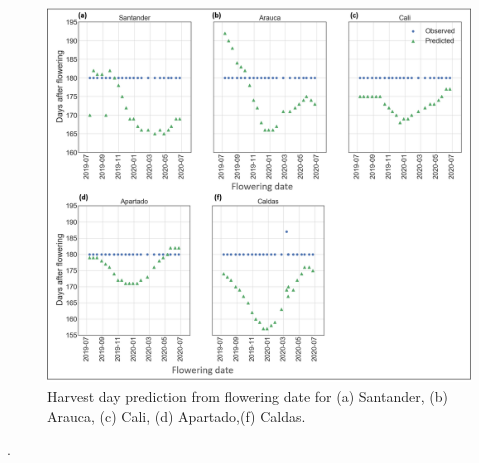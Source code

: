 \documentclass[gene,journal,article,submit,moreauthors,pdftex]{Definitions/mdpi}
\begin{document}
\begin{figure}[h!]
	\centering
	\includegraphics[scale=0.4]{images/RegionHarvest2.png}
	\caption{\footnotesize {Harvest day prediction from flowering date for (a) Santander, (b) Arauca, (c) Cali, (d) Apartado,(f) Caldas. \\ }} 
	\label{fig:dayH}
\end{figure}.
\newpage
\end{document}
